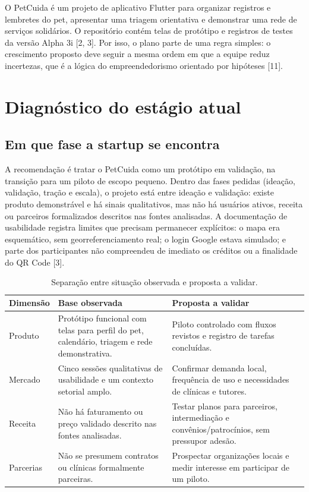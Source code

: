 \documentclass[12pt,a4paper]{article}
\begin{document}
O PetCuida é um projeto de aplicativo Flutter para organizar registros e lembretes do pet, apresentar uma triagem orientativa e demonstrar uma rede de serviços solidários. O repositório contém telas de protótipo e registros de testes da versão Alpha 3i [2, 3]. Por isso, o plano parte de uma regra simples: o crescimento proposto deve seguir a mesma ordem em que a equipe reduz incertezas, que é a lógica do empreendedorismo orientado por hipóteses [11].

\section{Diagnóstico do estágio atual}

\subsection{Em que fase a startup se encontra}

A recomendação é tratar o PetCuida como um protótipo em validação, na transição para um piloto de escopo pequeno. Dentro das fases pedidas (ideação, validação, tração e escala), o projeto está entre ideação e validação: existe produto demonstrável e há sinais qualitativos, mas não há usuários ativos, receita ou parceiros formalizados descritos nas fontes analisadas. A documentação de usabilidade registra limites que precisam permanecer explícitos: o mapa era esquemático, sem georreferenciamento real; o login Google estava simulado; e parte dos participantes não compreendeu de imediato os créditos ou a finalidade do QR Code [3].

\begin{table}[H]
\centering
\small
\caption{Separação entre situação observada e proposta a validar.}
\begin{tabularx}{\textwidth}{P{3.1cm}YY}
\toprule
\textbf{Dimensão} & \textbf{Base observada} & \textbf{Proposta a validar} \\
\midrule
Produto & Protótipo funcional com telas para perfil do pet, calendário, triagem e rede demonstrativa. & Piloto controlado com fluxos revistos e registro de tarefas concluídas. \\
Mercado & Cinco sessões qualitativas de usabilidade e um contexto setorial amplo. & Confirmar demanda local, frequência de uso e necessidades de clínicas e tutores. \\
Receita & Não há faturamento ou preço validado descrito nas fontes analisadas. & Testar planos para parceiros, intermediação e convênios/patrocínios, sem pressupor adesão. \\
Parcerias & Não se presumem contratos ou clínicas formalmente parceiras. & Prospectar organizações locais e medir interesse em participar de um piloto. \\
\bottomrule
\end{tabularx}
\end{table}
\end{document}
